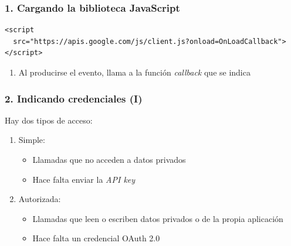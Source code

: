 
\begin{frame}[fragile]
\frametitle{1. Cargando la biblioteca JavaScript}


\begin{footnotesize}
\begin{verbatim}
<script 
  src="https://apis.google.com/js/client.js?onload=OnLoadCallback">
</script>
\end{verbatim}
\end{footnotesize}

\begin{enumerate}
  \item Al producirse el evento, llama a la función \emph{callback} que se indica
\end{enumerate}


\end{frame}


\begin{frame}
\frametitle{2. Indicando credenciales (I)}

Hay dos tipos de acceso:

\begin{enumerate}
  \item Simple:
  \begin{itemize}
    \item Llamadas que no acceden a datos privados
    \item Hace falta enviar la \emph{API key}
  \end{itemize}
  \item Autorizada:
  \begin{itemize}
    \item Llamadas que leen o escriben datos privados o de la propia aplicación
    \item Hace falta un credencial OAuth 2.0
  \end{itemize}
\end{enumerate}

\end{frame}



